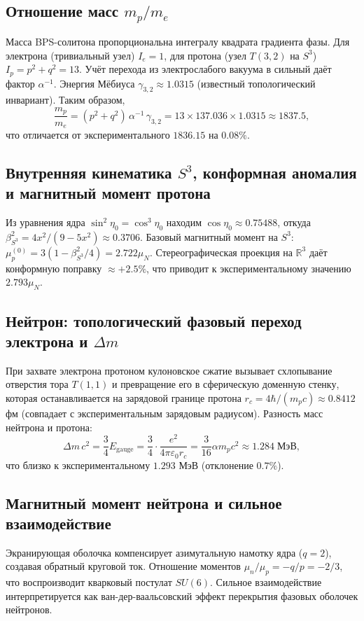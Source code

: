 \documentclass[11pt,a4paper]{article}
\begin{document}
	\subsection{Отношение масс $m_p/m_e$}
	Масса BPS-солитона пропорциональна интегралу квадрата градиента фазы. Для электрона (тривиальный узел) $I_e=1$, для протона (узел $T(3,2)$ на $S^3$) $I_p=p^2+q^2=13$. Учёт перехода из электрослабого вакуума в сильный даёт фактор $\alpha^{-1}$. Энергия Мёбиуса $\gamma_{3,2}\approx1.0315$ (известный топологический инвариант). Таким образом,
	\begin{equation}
		\frac{m_p}{m_e} = (p^2+q^2)\,\alpha^{-1}\,\gamma_{3,2} = 13\times 137.036\times1.0315 \approx 1837.5,
	\end{equation}
	что отличается от экспериментального $1836.15$ на $0.08\%$.
	
	\subsection{Внутренняя кинематика $S^3$, конформная аномалия и магнитный момент протона}
	Из уравнения ядра $\sin^2\eta_0=\cos^3\eta_0$ находим $\cos\eta_0\approx0.75488$, откуда $\beta_{S^3}^2 = 4x^2/(9-5x^2)\approx0.3706$. Базовый магнитный момент на $S^3$: $\mu_p^{(0)} = 3(1-\beta_{S^3}^2/4)=2.722\mu_N$. Стереографическая проекция на $\mathbb{R}^3$ даёт конформную поправку $\approx+2.5\%$, что приводит к экспериментальному значению $2.793\mu_N$.
	
	\subsection{Нейтрон: топологический фазовый переход электрона и $\Delta m$}
	При захвате электрона протоном кулоновское сжатие вызывает схлопывание отверстия тора $T(1,1)$ и превращение его в сферическую доменную стенку, которая останавливается на зарядовой границе протона $r_c=4\hbar/(m_p c)\approx0.8412$ фм (совпадает с экспериментальным зарядовым радиусом). Разность масс нейтрона и протона:
	\begin{equation}
		\Delta m\,c^2 = \frac{3}{4}E_{\text{gauge}} = \frac{3}{4}\cdot\frac{e^2}{4\pi\varepsilon_0 r_c} = \frac{3}{16}\alpha m_p c^2 \approx 1.284\;\text{МэВ},
	\end{equation}
	что близко к экспериментальному $1.293$ МэВ (отклонение $0.7\%$).
	
	\subsection{Магнитный момент нейтрона и сильное взаимодействие}
	Экранирующая оболочка компенсирует азимутальную намотку ядра ($q=2$), создавая обратный круговой ток. Отношение моментов $\mu_n/\mu_p = -q/p = -2/3$, что воспроизводит кварковый постулат $SU(6)$. Сильное взаимодействие интерпретируется как ван-дер-ваальсовский эффект перекрытия фазовых оболочек нейтронов.
	
\end{document}
